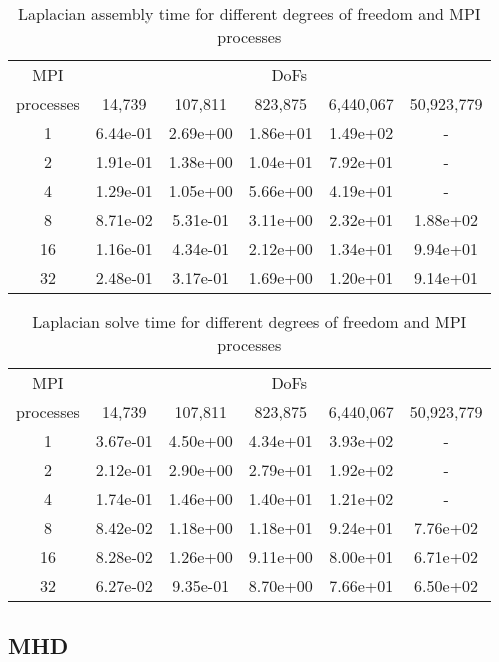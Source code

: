\documentclass[11pt]{article}
\begin{document}
\begin{table}[h!]
    \centering
    \begin{tabular}{|c|ccccc|}
        \hline
        MPI & \multicolumn{5}{c|}{DoFs}\\
        processes &  14,739   &   107,811  &   823,875  &   6,440,067  & 50,923,779 \\
        \hline
            1 & 6.44e-01 &  2.69e+00 &  1.86e+01 &  1.49e+02 & - \\
            2 & 1.91e-01 &  1.38e+00 &  1.04e+01 &  7.92e+01 & - \\
            4 & 1.29e-01 &  1.05e+00 &  5.66e+00 &  4.19e+01 & - \\
            8 & 8.71e-02 &  5.31e-01 &  3.11e+00 &  2.32e+01 & 1.88e+02 \\
            16 & 1.16e-01 &  4.34e-01 &  2.12e+00 &  1.34e+01 & 9.94e+01 \\
            32 & 2.48e-01 &  3.17e-01 &  1.69e+00 &  1.20e+01 & 9.14e+01 \\
        \hline
    \end{tabular}
    \caption{Laplacian assembly time for different degrees of freedom and MPI processes}
\end{table}


\begin{table}[h!]
    \centering
    \begin{tabular}{|c|ccccc|}
        \hline
        MPI & \multicolumn{5}{c|}{DoFs}\\
        processes &  14,739   &   107,811  &   823,875  &   6,440,067  & 50,923,779 \\
        \hline
        1 & 3.67e-01 &  4.50e+00 &  4.34e+01 &  3.93e+02 & - \\
        2 & 2.12e-01 &  2.90e+00 &  2.79e+01 &  1.92e+02 & - \\
        4 & 1.74e-01 &  1.46e+00 &  1.40e+01 &  1.21e+02 & - \\
        8 & 8.42e-02 &  1.18e+00 &  1.18e+01 &  9.24e+01 & 7.76e+02 \\
        16 & 8.28e-02 &  1.26e+00 &  9.11e+00 &  8.00e+01 & 6.71e+02 \\
        32 & 6.27e-02 &  9.35e-01 &  8.70e+00 &  7.66e+01 & 6.50e+02 \\
        \hline
    \end{tabular}
    \caption{Laplacian solve time for different degrees of freedom and MPI processes}
\end{table}

\subsection{MHD}
\end{document}
